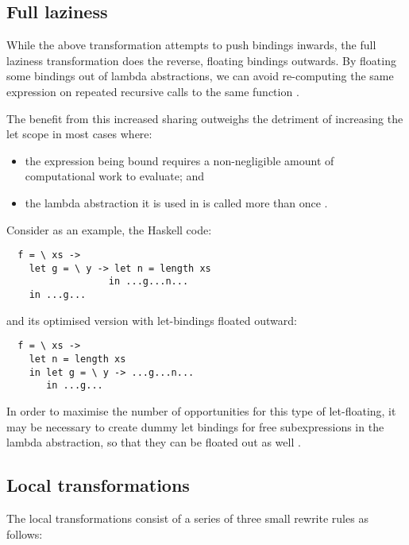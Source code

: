 \subsection*{Full laziness}

While the above transformation attempts to push bindings inwards, the full laziness transformation does the reverse, floating bindings outwards. By floating some bindings out of lambda abstractions, we can avoid re-computing the same expression on repeated recursive calls to the same function \citep{jones1996}.

The benefit from this increased sharing outweighs the detriment of increasing the let scope in most cases where:
\begin{itemize}
\item the expression being bound requires a non-negligible amount of computational work to evaluate; and
\item the lambda abstraction it is used in is called more than once \citep{jones1996}.
\end{itemize}

Consider as an example, the Haskell code\citep{jones1996}:
\begin{lstlisting}
  f = \ xs ->
    let g = \ y -> let n = length xs
                  in ...g...n...
    in ...g...
\end{lstlisting}

and its optimised version with let-bindings floated outward:
\begin{lstlisting}
  f = \ xs ->
    let n = length xs
    in let g = \ y -> ...g...n...
       in ...g...
\end{lstlisting}

In order to maximise the number of opportunities for this type of let-floating, it may be necessary to create dummy let bindings for free subexpressions in the lambda abstraction, so that they can be floated out as well \citep{jones1996}.

\subsection*{Local transformations}

The local transformations consist of a series of three small rewrite rules as follows:


